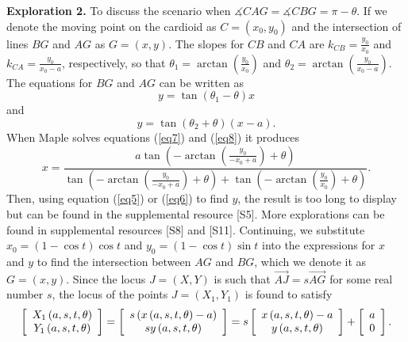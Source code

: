 \documentclass[12pt,a4paper]{article}%
\begin{document}
\textbf{Exploration 2.}
To discuss the scenario when
$\measuredangle CAG = \measuredangle CBG = \pi-\theta$.
If we denote the moving point on the cardioid as $C=\left(x_{0},y_{0}\right)$
and the intersection of lines $BG$ and $AG$ as $G=\left(  x,y\right)$.
The slopes for $CB$ and $CA$ are $k_{CB} = \frac{y_{0}}{x_{0}}$
and $k_{CA}=\frac{y_{0}}{x_{0}-a}$, respectively, so that
$\theta_{1}=\arctan\left(  \frac{y_{0}}{x_{0}}\right)$ and
$\theta_{2}=\arctan\left(  \frac{y_{0}}{x_{0}-a}\right)$.
The equations for $BG$ and $AG$ can be written as
\begin{equation}
y=\tan\left(  \theta_{1}-\theta\right)  x \label{eq7}
\end{equation}
and
\begin{equation}
y=\tan\left(  \theta_{2}+\theta\right)  \left(  x-a\right).  \label{eq8}
\end{equation}
When Maple \cite{Maple} solves equations (\ref{eq7}) and (\ref{eq8}) it produces
\[
x=\frac{a\tan\left(  -\arctan\left(  \frac{y_{0}}{-x_{0}+a}\right)
+\theta\right)  }{\tan\left(  -\arctan\left(  \frac{y_{0}}{-x_{0}+a}\right)
+\theta\right)  +\tan\left(  -\arctan\left(  \frac{y_{0}}{x_{0}}\right)
+\theta\right)  }.
\]
Then, using equation (\ref{eq5}) or (\ref{eq6}) to find $y$, the result is too long
to display but can be found in the supplemental resource [S5].
More explorations can be found in supplemental resources [S8] and [S11].
Continuing, we substitute $x_{0}=\left(  1-\cos t\right)  \cos t$ and
$y_{0}=\left(  1-\cos t\right)  \sin t$ into the expressions for $x$ and $y$ to find
the intersection between $AG$ and $BG$, which we denote it as $G=(x,y)$. Since
the locus $J=(X,Y)$ is such that $\overrightarrow{AJ}=s\overrightarrow{AG}$
for some real number $s$, the locus of the points $J=(X_1,Y_1)$ is found to satisfy
\[
\left[
\begin{array}
[c]{c}%
X_{1}\left(  a,s,t,\theta\right) \\
Y_{1}\left(  a,s,t,\theta\right)
\end{array}
\right]  =\left[
\begin{array}
[c]{c}%
s\left(  x\left(  a,s,t,\theta\right)  -a\right) \\
sy\left(  a,s,t,\theta\right)
\end{array}
\right]  =s\left[
\begin{array}
[c]{c}%
x\left(  a,s,t,\theta\right)  -a\\
y\left(  a,s,t,\theta\right)
\end{array}
\right]  +\left[
\begin{array}
[c]{c}%
a\\
0
\end{array}
\right]  .
\]
\end{document}
